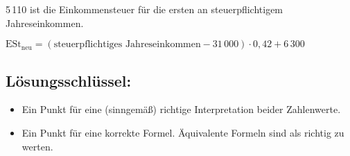 \begin{langesbeispiel}
{\begin{enumerate}
5\,110 ist die Einkommensteuer für die ersten  an steuerpflichtigem Jahreseinkommen.

$\text{ESt}_\text{neu}=(\text{steuerpflichtiges Jahreseinkommen}-31\,000)\cdot 0,42+6\,300$
	\subsection{Lösungsschlüssel:}
	
\begin{itemize}
	\item Ein Punkt für eine (sinngemäß) richtige Interpretation beider Zahlenwerte.
	\item Ein Punkt für eine korrekte Formel. Äquivalente Formeln sind als richtig zu werten.
\end{itemize}

\end{enumerate}}
		\end{langesbeispiel}